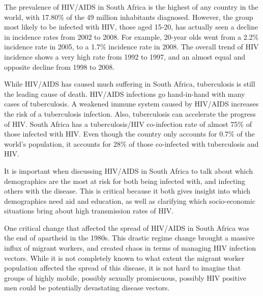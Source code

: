 \documentclass[12pt]{report}
\begin{document}
The prevalence of HIV/AIDS in South Africa is the highest of any country in the world, with 17.80\% of the 49 million inhabitants diagnosed\cite{cia}.
However, the group most likely to be infected with HIV, those aged 15-20, has actually seen a decline in incidence rates from 2002 to 2008\cite{shisana}.
For example, 20-year olds went from a 2.2\% incidence rate in 2005, to a 1.7\% incidence rate in 2008.
The overall trend of HIV incidence shows a very high rate from 1992 to 1997, and an almost equal and opposite decline from 1998 to 2008\cite{gap-incidence}.

While HIV/AIDS has caused much suffering in South Africa, tuberculosis is still the leading cause of death.
HIV/AIDS infections go hand-in-hand with many cases of tuberculosis.
A weakened immune system caused by HIV/AIDS increases the risk of a tuberculosis infection.
Also, tuberculosis can accelerate the progress of HIV.
South Africa has a tuberculosis/HIV co-infection rate of almost 75\% of those infected with HIV.
Even though the country only accounts for 0.7\% of the world's population, it accounts for 28\% of those co-infected with tuberculosis and HIV\cite{avert}.

It is important when discussing HIV/AIDS in South Africa to talk about which demographics are the most at risk for both being infected with, and infecting others with the disease.
This is critical because it both gives insight into which demographics need aid and education, as well as clarifying which socio-economic situations bring about high transmission rates of HIV.

One critical change that affected the spread of HIV/AIDS in South Africa was the end of apartheid in the 1980s\cite{wiki-apartheid}.
This drastic regime change brought a massive influx of migrant workers, and created chaos in terms of managing HIV infection vectors.
While it is not completely known to what extent the migrant worker population affected the spread of this disease, it is not hard to imagine that groups of highly mobile, possibly sexually promiscuous, possibly HIV positive men could be potentially devastating disease vectors\cite{migration}.
\end{document}
